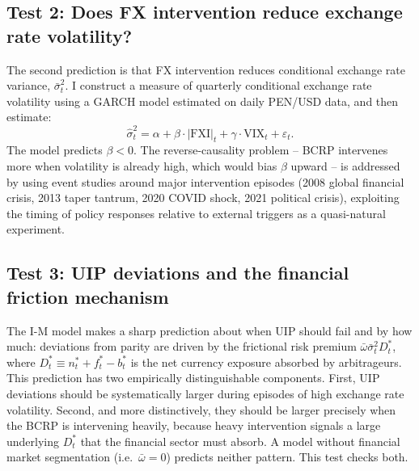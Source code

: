 \documentclass[12pt,a4paper]{article}
\begin{document}
\subsection{Test 2: Does FX intervention reduce exchange rate volatility?}

The second prediction is that FX intervention reduces conditional exchange rate variance, $\bar{\sigma}^2_t$. I construct a measure of quarterly conditional exchange rate volatility using a GARCH model estimated on daily PEN/USD data, and then estimate:
\begin{equation}
    \hat{\sigma}^2_t = \alpha + \beta \cdot |\text{FXI}|_t + \gamma \cdot \text{VIX}_t + \varepsilon_t.
    \label{eq:test2}
\end{equation}
The model predicts $\beta < 0$. The reverse-causality problem -- BCRP intervenes more when volatility is already high, which would bias $\beta$ upward -- is addressed by using event studies around major intervention episodes (2008 global financial crisis, 2013 taper tantrum, 2020 COVID shock, 2021 political crisis), exploiting the timing of policy responses relative to external triggers as a quasi-natural experiment.

\subsection{Test 3: UIP deviations and the financial friction mechanism}

The I-M model makes a sharp prediction about when UIP should fail and by how much: deviations from parity are driven by the frictional risk premium $\bar{\omega}\bar{\sigma}^2_t D^*_t$, where $D^*_t \equiv n^*_t + f^*_t - b^*_t$ is the net currency exposure absorbed by arbitrageurs. This prediction has two empirically distinguishable components. First, UIP deviations should be systematically larger during episodes of high exchange rate volatility. Second, and more distinctively, they should be larger precisely when the BCRP is intervening heavily, because heavy intervention signals a large underlying $D^*_t$ that the financial sector must absorb. A model without financial market segmentation (i.e.\ $\bar{\omega} = 0$) predicts neither pattern. This test checks both.
\end{document}
